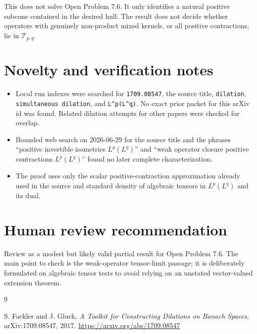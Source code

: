 \documentclass[11pt]{amsart}
\theoremstyle{remark}
\newcommand{\calT}{\mathcal T}
\begin{document}
This does not solve Open Problem 7.6.  It only identifies a natural positive
subcone contained in the desired hull.  The result does not decide whether
operators with genuinely non-product mixed kernels, or all positive
contractions, lie in $\calT_{p,q}$.

\section*{Novelty and verification notes}

\begin{itemize}[leftmargin=*]
\item Local run indexes were searched for \texttt{1709.08547}, the source
title, \texttt{dilation}, \texttt{simultaneous dilation}, and
\texttt{L\^{}p(L\^{}q)}.  No exact prior packet for this arXiv id was found.
Related dilation attempts for other papers were checked for overlap.
\item Bounded web search on 2026-06-29 for the source title and the phrases
``positive invertible isometries $L^p(L^q)$'' and ``weak operator closure
positive contractions $L^p(L^q)$'' found no later complete characterization.
\item The proof uses only the scalar positive-contraction approximation already
used in the source and standard density of algebraic tensors in
$L^p(L^q)$ and its dual.
\end{itemize}

\section*{Human review recommendation}

Review as a modest but likely valid partial result for Open Problem 7.6.  The
main point to check is the weak-operator tensor-limit passage; it is deliberately
formulated on algebraic tensor tests to avoid relying on an unstated
vector-valued extension theorem.

\begin{thebibliography}{9}

S. Fackler and J. Gluck,
\emph{A Toolkit for Constructing Dilations on Banach Spaces},
arXiv:1709.08547, 2017.
\url{https://arxiv.org/abs/1709.08547}

\end{thebibliography}
\end{document}
